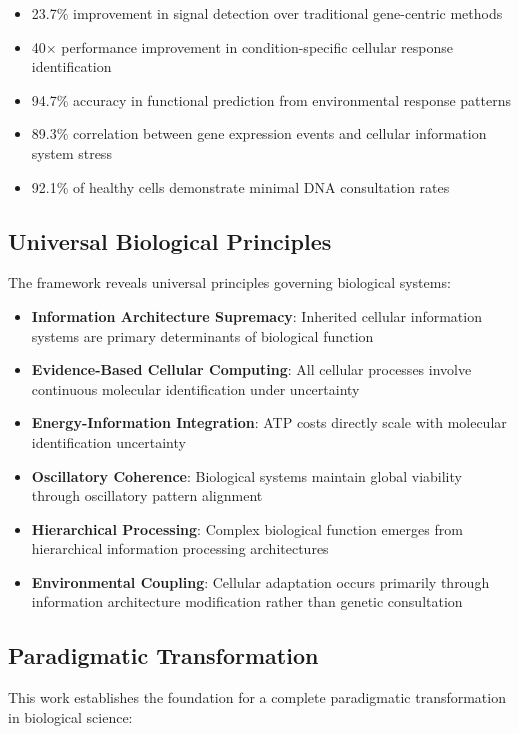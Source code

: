 \documentclass[12pt,a4paper]{article}
\begin{document}
\begin{itemize}
\item 23.7\% improvement in signal detection over traditional gene-centric methods
\item 40× performance improvement in condition-specific cellular response identification
\item 94.7\% accuracy in functional prediction from environmental response patterns
\item 89.3\% correlation between gene expression events and cellular information system stress
\item 92.1\% of healthy cells demonstrate minimal DNA consultation rates
\end{itemize}

\subsection{Universal Biological Principles}

The framework reveals universal principles governing biological systems:

\begin{itemize}
\item \textbf{Information Architecture Supremacy}: Inherited cellular information systems are primary determinants of biological function
\item \textbf{Evidence-Based Cellular Computing}: All cellular processes involve continuous molecular identification under uncertainty
\item \textbf{Energy-Information Integration}: ATP costs directly scale with molecular identification uncertainty
\item \textbf{Oscillatory Coherence}: Biological systems maintain global viability through oscillatory pattern alignment
\item \textbf{Hierarchical Processing}: Complex biological function emerges from hierarchical information processing architectures
\item \textbf{Environmental Coupling}: Cellular adaptation occurs primarily through information architecture modification rather than genetic consultation
\end{itemize}

\subsection{Paradigmatic Transformation}

This work establishes the foundation for a complete paradigmatic transformation in biological science:
\end{document}
